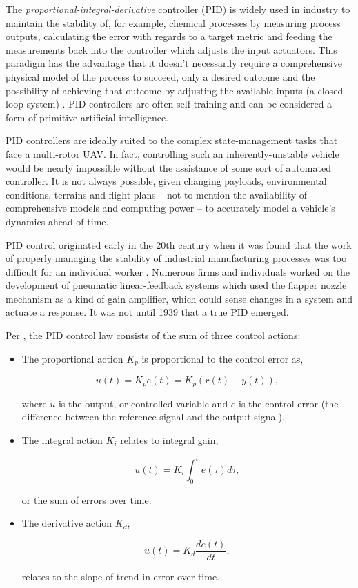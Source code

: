 The \emph{proportional-integral-derivative} controller (PID) is widely used in industry \cite{Soediono1989} to maintain the stability of, for example, chemical processes by measuring process outputs, calculating the error with regards to a target metric and feeding the measurements back into the controller which adjusts the input actuators. This paradigm has the advantage that it doesn’t necessarily require a comprehensive physical model of the process to succeed, only a desired outcome and the possibility of achieving that outcome by adjusting the available inputs (a closed-loop system) \cite{Soediono1989}. PID controllers are often self-training and can be considered a form of primitive artificial intelligence.

PID controllers are ideally suited to the complex state-management tasks that face a multi-rotor UAV. In fact, controlling such an inherently-unstable vehicle would be nearly impossible without the assistance of some sort of automated controller. It is not always possible, given changing payloads, environmental conditions, terrains and flight plans -- not to mention the availability of comprehensive models and computing power -- to accurately model a vehicle’s dynamics ahead of time. 

PID control originated early in the 20th century when it was found that the work of properly managing the stability of industrial manufacturing processes was too difficult for an individual worker \cite{Bennett2001}. Numerous firms and individuals worked on the development of pneumatic linear-feedback systems which used the flapper nozzle mechanism as a kind of gain amplifier, which could sense changes in a system and actuate a response. It was not until 1939 that a true PID emerged.

Per \cite{Soediono1989}, the PID control law consists of the sum of three control actions:

\begin{itemize}
\item The proportional action $K_p$ is proportional to the control error as, 

\begin{equation}
u(t) = K_p e(t) = K_p(r(t) - y(t)),
\end{equation}

where $u$ is the output, or controlled variable and $e$ is the control error (the difference between the reference signal and the output signal). 

\item The integral action $K_i$ relates to integral gain, 

\begin{equation}
u(t) = K_i \int_0^t e(\tau) d\tau,
\end{equation}

or the sum of errors over time. 

\item The derivative action $K_d$, 

\begin{equation}
u(t) = K_d \frac{de(t)}{dt},
\end{equation}

relates to the slope of trend in error over time.
\end{itemize}

